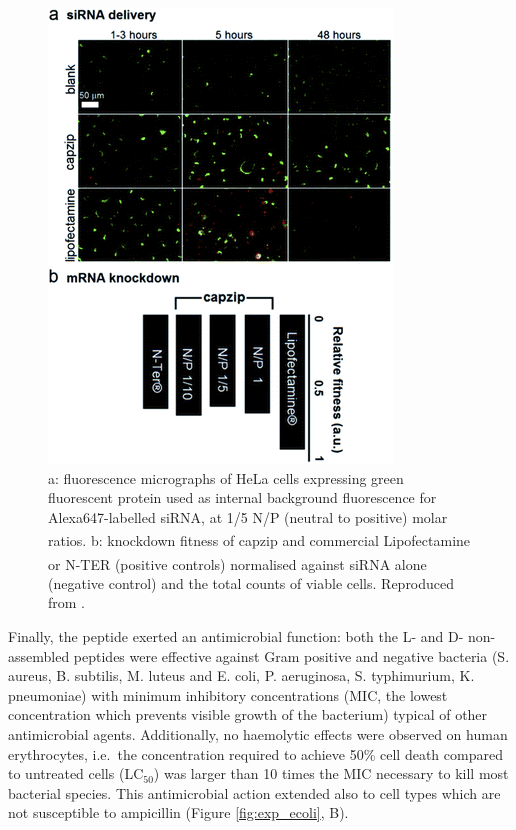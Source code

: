 \begin{figure}
\begin{center}
\includegraphics[width=0.6\linewidth, align = c]{1introduction/pics/capzip_delivery.png}
\caption[Capzip promoted RNA transfection]{a: fluorescence micrographs of HeLa cells expressing green fluorescent protein used as internal background fluorescence for Alexa647-labelled siRNA, at 1/5 N/P (neutral to positive) molar ratios. b: knockdown fitness of capzip and commercial Lipofectamine\textsuperscript{\textregistered} or N-TER\textsuperscript{\textregistered} (positive controls) normalised against siRNA alone (negative control) and the total counts of viable cells. Reproduced from \citet{Castelletto2016}.} \label{fig:exp_rna}
\end{center}
\end{figure}

Finally, the peptide exerted an antimicrobial function: both the L- and D- non-assembled peptides were effective against Gram positive and negative bacteria (S. aureus, B. subtilis, M. luteus and E. coli, P. aeruginosa, S. typhimurium, K. pneumoniae)
with minimum inhibitory concentrations (MIC, the lowest concentration which prevents visible growth of the bacterium) typical of other antimicrobial agents. Additionally, no haemolytic effects were observed on human erythrocytes, i.e.\ the concentration required to achieve 50\% cell death compared to untreated cells (LC$_{50}$) was larger than 10 times the MIC necessary to kill most bacterial species.
%
This antimicrobial action extended also to cell types which are not susceptible to ampicillin (Figure \ref{fig:exp_ecoli}, B).

